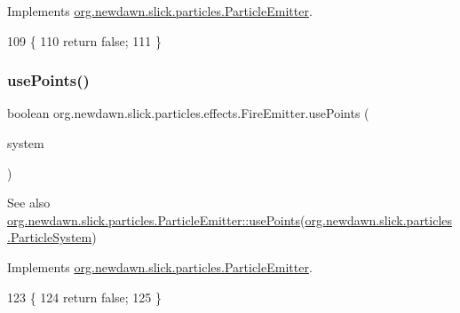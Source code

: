 Implements \mbox{\hyperlink{interfaceorg_1_1newdawn_1_1slick_1_1particles_1_1_particle_emitter_a36f6bfeef5567c7c5b42c866a738cdb7}{org.\+newdawn.\+slick.\+particles.\+Particle\+Emitter}}.


\begin{DoxyCode}
109                                  \{
110         \textcolor{keywordflow}{return} \textcolor{keyword}{false};
111     \}
\end{DoxyCode}
\mbox{\label{classorg_1_1newdawn_1_1slick_1_1particles_1_1effects_1_1_fire_emitter_ab1eb7609b370a6a8cffbb5b7e1bd6cb3}} 
\subsubsection{\texorpdfstring{use\+Points()}{usePoints()}}
{\footnotesize\ttfamily boolean org.\+newdawn.\+slick.\+particles.\+effects.\+Fire\+Emitter.\+use\+Points (\begin{DoxyParamCaption}\item[{\mbox{\hyperlink{classorg_1_1newdawn_1_1slick_1_1particles_1_1_particle_system}{Particle\+System}}}]{system }\end{DoxyParamCaption})\hspace{0.3cm}{\ttfamily [inline]}}

\begin{DoxySeeAlso}{See also}
\mbox{\hyperlink{interfaceorg_1_1newdawn_1_1slick_1_1particles_1_1_particle_emitter_a26ad157d83aebf2e49163ddaae6a9edd}{org.\+newdawn.\+slick.\+particles.\+Particle\+Emitter\+::use\+Points}}(\mbox{\hyperlink{classorg_1_1newdawn_1_1slick_1_1particles_1_1_particle_system}{org.\+newdawn.\+slick.\+particles.\+Particle\+System}}) 
\end{DoxySeeAlso}


Implements \mbox{\hyperlink{interfaceorg_1_1newdawn_1_1slick_1_1particles_1_1_particle_emitter_a26ad157d83aebf2e49163ddaae6a9edd}{org.\+newdawn.\+slick.\+particles.\+Particle\+Emitter}}.


\begin{DoxyCode}
123                                                     \{
124         \textcolor{keywordflow}{return} \textcolor{keyword}{false};
125     \}
\end{DoxyCode}
\mbox{\label{classorg_1_1newdawn_1_1slick_1_1particles_1_1effects_1_1_fire_emitter_a8e888bb6d290b9df6883d0ebb35f1067}} 
